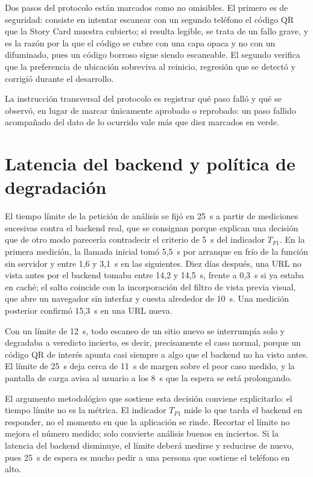 Dos pasos del protocolo están marcados como no omisibles. El primero es de seguridad:
consiste en intentar escanear con un segundo teléfono el código QR que la Story Card
muestra cubierto; si resulta legible, se trata de un fallo grave, y es la razón por la
que el código se cubre con una capa opaca y no con un difuminado, pues un código
borroso sigue siendo escaneable. El segundo verifica que la preferencia de ubicación
sobreviva al reinicio, regresión que se detectó y corrigió durante el desarrollo.

La instrucción transversal del protocolo es registrar qué paso falló y qué se observó,
en lugar de marcar únicamente aprobado o reprobado: un paso fallido acompañado del dato
de lo ocurrido vale más que diez marcados en verde.

\section{Latencia del backend y política de degradación}

El tiempo límite de la petición de análisis se fijó en 25~s a partir de mediciones
sucesivas contra el backend real, que se consignan porque explican una decisión que de
otro modo parecería contradecir el criterio de 5~s del indicador \(T_{F1}\). En la
primera medición, la llamada inicial tomó 5,5~s por arranque en frío de la función sin
servidor y entre 1,6 y 3,1~s en las siguientes. Diez días después, una URL no vista
antes por el backend tomaba entre 14,2 y 14,5~s, frente a 0,3~s si ya estaba en caché;
el salto coincide con la incorporación del filtro de vista previa visual, que abre un
navegador sin interfaz y cuesta alrededor de 10~s. Una medición posterior confirmó
15,3~s en una URL nueva.

Con un límite de 12~s, todo escaneo de un sitio nuevo se interrumpía solo y degradaba
a veredicto incierto, es decir, precisamente el caso normal, porque un código QR de
interés apunta casi siempre a algo que el backend no ha visto antes. El límite de 25~s
deja cerca de 11~s de margen sobre el peor caso medido, y la pantalla de carga avisa al
usuario a los 8~s que la espera se está prolongando.

El argumento metodológico que sostiene esta decisión conviene explicitarlo: el tiempo
límite no es la métrica. El indicador \(T_{F1}\) mide lo que tarda el backend en
responder, no el momento en que la aplicación se rinde. Recortar el límite no mejora el
número medido; solo convierte análisis buenos en inciertos. Si la latencia del backend
disminuye, el límite deberá medirse y reducirse de nuevo, pues 25~s de espera es mucho
pedir a una persona que sostiene el teléfono en alto.

